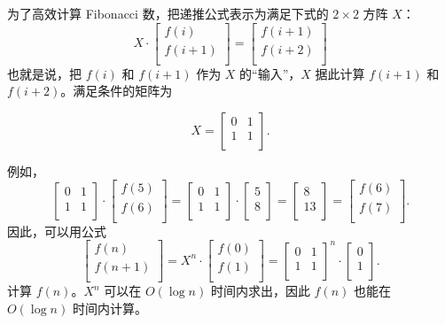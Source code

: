 \begin{samepage}
为了高效计算 Fibonacci 数，把递推公式表示为满足下式的 $2 \times 2$ 方阵 $X$：
\[ X \cdot
 \begin{bmatrix}
  f(i) \\
  f(i+1) \\
 \end{bmatrix}
=
 \begin{bmatrix}
  f(i+1) \\
  f(i+2) \\
 \end{bmatrix}
 \]
也就是说，把 $f(i)$ 和 $f(i+1)$ 作为 $X$ 的“输入”，$X$ 据此计算 $f(i+1)$ 和 $f(i+2)$。满足条件的矩阵为

\[ X = 
 \begin{bmatrix}
  0 & 1 \\
  1 & 1 \\
 \end{bmatrix}.
\]
\end{samepage}
\noindent
例如，
\[
 \begin{bmatrix}
  0 & 1 \\
  1 & 1 \\
 \end{bmatrix}
\cdot
 \begin{bmatrix}
  f(5) \\
  f(6) \\
 \end{bmatrix}
=
 \begin{bmatrix}
  0 & 1 \\
  1 & 1 \\
 \end{bmatrix}
\cdot
 \begin{bmatrix}
  5 \\
  8 \\
 \end{bmatrix}
=
 \begin{bmatrix}
  8 \\
  13 \\
 \end{bmatrix}
=
 \begin{bmatrix}
  f(6) \\
  f(7) \\
 \end{bmatrix}.
\]
因此，可以用公式
\[
 \begin{bmatrix}
  f(n) \\
  f(n+1) \\
 \end{bmatrix}
=
X^n \cdot
 \begin{bmatrix}
  f(0) \\
  f(1) \\
 \end{bmatrix}
=
 \begin{bmatrix}
  0 & 1 \\
  1 & 1 \\
 \end{bmatrix}^n
\cdot
 \begin{bmatrix}
  0 \\
  1 \\
 \end{bmatrix}.
\]
计算 $f(n)$。$X^n$ 可以在 $O(\log n)$ 时间内求出，因此 $f(n)$ 也能在 $O(\log n)$ 时间内计算。

